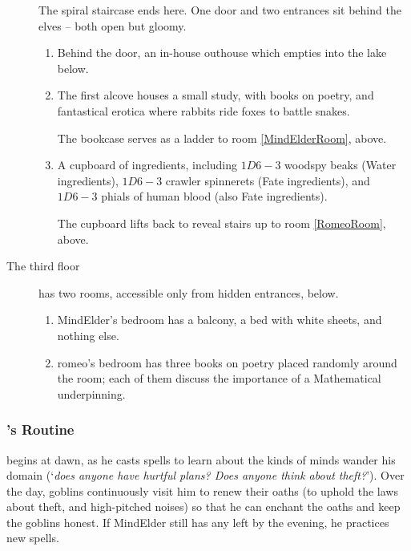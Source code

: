 \begin{multicols}{2}
\begin{description}
  The spiral staircase ends here.
  One door and two entrances sit behind the elves -- both open but gloomy.
  \begin{enumerate}
    \item
    Behind the door, an in-house outhouse which empties into the lake below.
    \item
    The first alcove houses a small study, with books on poetry, and fantastical erotica where rabbits ride foxes to battle snakes.

    The bookcase serves as a ladder to room \ref{MindElderRoom}, above.
    \item
    A cupboard of \glspl{ingredient}, including $1D6-3$ \gls{woodspy} beaks (Water \glspl{ingredient}), $1D6-3$ \gls{crawler} spinnerets (Fate \glspl{ingredient}), and $1D6-3$ phials of human blood (also Fate \glspl{ingredient}).

    The cupboard lifts back to reveal stairs up to room \ref{RomeoRoom}, above.
  \end{enumerate}
  \item[The third floor]
  has two rooms, accessible only from hidden entrances, below.
  \begin{enumerate}
    \item
    \Gls{MindElder}'s bedroom has a balcony, a bed with white sheets, and nothing else.\label{MindElderRoom}
    \item
    \Gls{romeo}'s bedroom has three books on poetry placed randomly around the room; each of them discuss the importance of a Mathematical underpinning.\label{RomeoRoom}
  \end{enumerate}
\end{description}



\subsubsection{'s Routine}
begins at dawn, as he casts spells to learn about the kinds of minds wander his domain (`\textit{does anyone have hurtful plans?  Does anyone think about theft?}').
Over the day, goblins continuously visit him to renew their oaths (to uphold the laws about theft, and high-pitched noises) so that he can enchant the oaths and keep the goblins honest.
If \gls{MindElder} still has any  left by the evening, he practices new spells.

\MindElder

\showStdSpells[
  
  
  
  
]

\end{multicols}



